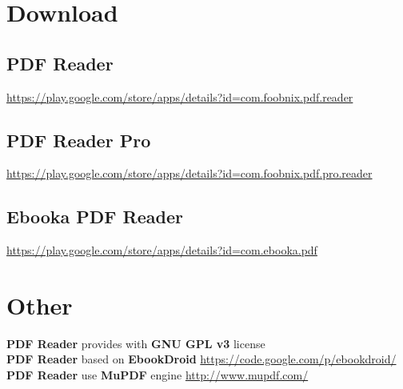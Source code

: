 \documentclass[14pt,letter]{article}
\begin{document}
\newpage
\section{Download}

\subsection{PDF Reader} \url{https://play.google.com/store/apps/details?id=com.foobnix.pdf.reader} \\
\subsection{PDF Reader Pro} \url{https://play.google.com/store/apps/details?id=com.foobnix.pdf.pro.reader} \\
\subsection{Ebooka PDF Reader} \url{https://play.google.com/store/apps/details?id=com.ebooka.pdf}

\section{Other}
\textbf{PDF Reader} provides with \textbf{GNU GPL v3} license\\
\textbf{PDF Reader} based on \textbf{EbookDroid} \url{https://code.google.com/p/ebookdroid/} \\
\textbf{PDF Reader} use  \textbf{MuPDF} engine \url{http://www.mupdf.com/}
\end{document}
